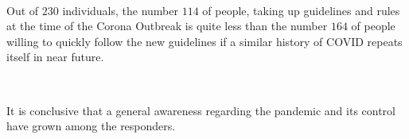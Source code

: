 \

Out of $230$ individuals, the number $114$ of people, taking up guidelines and rules at the time of the Corona Outbreak is quite less than the number $164$ of people willing to quickly follow the new guidelines if a similar history of COVID repeats itself in near future. 

\

It is conclusive that a general awareness regarding the pandemic and its control have grown among the responders.